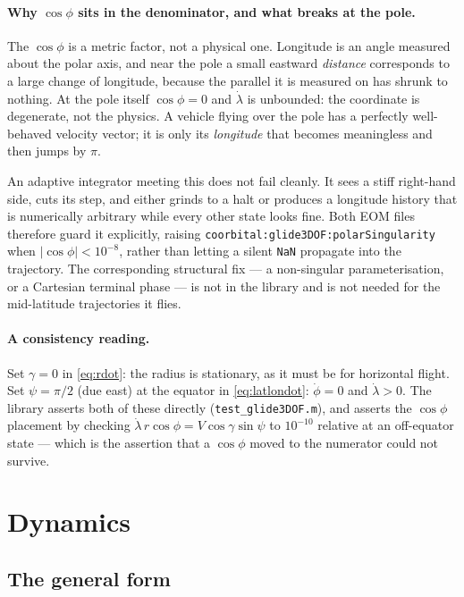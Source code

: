 \documentclass[11pt]{article}
\newcommand{\code}[1]{\texttt{#1}}
\begin{document}
\paragraph{Why $\cos\phi$ sits in the denominator, and what breaks at the pole.}
The $\cos\phi$ is a metric factor, not a physical one. Longitude is an angle
measured about the polar axis, and near the pole a small eastward
\emph{distance} corresponds to a large change of longitude, because the
parallel it is measured on has shrunk to nothing. At the pole itself
$\cos\phi=0$ and $\dot\lambda$ is unbounded: the coordinate is degenerate, not
the physics. A vehicle flying over the pole has a perfectly well-behaved
velocity vector; it is only its \emph{longitude} that becomes meaningless and
then jumps by $\pi$.

An adaptive integrator meeting this does not fail cleanly. It sees a stiff
right-hand side, cuts its step, and either grinds to a halt or produces a
longitude history that is numerically arbitrary while every other state looks
fine. Both EOM files therefore guard it explicitly, raising
\code{coorbital:glide3DOF:polarSingularity} when $|\cos\phi|<10^{-8}$, rather
than letting a silent \code{NaN} propagate into the trajectory. The
corresponding structural fix --- a non-singular parameterisation, or a
Cartesian terminal phase --- is not in the library and is not needed for the
mid-latitude trajectories it flies.

\paragraph{A consistency reading.} Set $\gamma=0$ in \eqref{eq:rdot}: the
radius is stationary, as it must be for horizontal flight. Set $\psi=\pi/2$
(due east) at the equator in \eqref{eq:latlondot}: $\dot\phi=0$ and
$\dot\lambda>0$. The library asserts both of these directly
(\code{test\_glide3DOF.m}), and asserts the $\cos\phi$ placement by checking
$\dot\lambda\,r\cos\phi = V\cos\gamma\sin\psi$ to $10^{-10}$ relative at an
off-equator state --- which is the assertion that a $\cos\phi$ moved to the
numerator could not survive.

\section{Dynamics}
\label{sec:dynamics}

\subsection{The general form}
\end{document}

